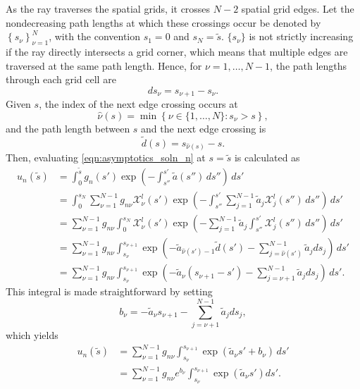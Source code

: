 As the ray traverses the spatial grids, it crosses $N-2$ spatial grid edges.
Let the nondecreasing path lengths at which these crossings occur be denoted by
$\left\{s_\nu\right\}_{\nu=1}^{N}$, with the convention $s_1=0$ and $s_{N}=\tilde{s}$.
$\{s_\nu\}$ is not strictly increasing if the ray directly intersects a grid corner,
which means that multiple edges are traversed at the same path length.
Hence, for $\nu=1,\ldots,N-1$, the path lengths through each grid cell are
\begin{equation*}
  ds_\nu = s_{\nu+1} - s_\nu.
\end{equation*}
Given $s$, the index of the next edge crossing occurs at
\begin{equation*}
  \hat{\nu}(s) = \min\left\{ \nu \in \{1,\ldots,N\} : s_\nu>s \right\},
\end{equation*}
and the path length between $s$ and the next edge crossing is
\begin{equation*}
  \tilde{d}(s) = s_{\hat{\nu}(s)}-s.
\end{equation*}
Then, evaluating \eqref{eqn:asymptotics_soln_n} at $s=\tilde{s}$ is calculated as
\begin{align*}
  u_n(\tilde{s}) &= \int_0^{\tilde{s}}g_n(s')\exp\left( -\int_{s''}^{s'}\tilde{a}(s'')\,ds'' \right)\, ds' \\
  &= \int_0^{s_N} \sum_{\nu=1}^{N-1}g_{n\nu}\mathcal{X}^l_\nu(s') \exp\left( -\int_{s''}^{s'}\sum_{j=1}^{N-1}\tilde{a}_{j}\mathcal{X}^l_j(s'')\,ds'' \right)\, ds' \\
  &= \sum_{\nu=1}^{N-1}g_{n\nu}\int_0^{s_N} \mathcal{X}^l_\nu(s') \exp\left( -\sum_{j=1}^{N-1}\tilde{a}_{j}\int_{s''}^{s'}\mathcal{X}^l_j(s'')\,ds'' \right)\, ds' \\
  &= \sum_{\nu=1}^{N-1}g_{n\nu}\int_{s_\nu}^{s_{\nu+1}}  \exp\left(-\tilde{a}_{\hat{\nu}(s')-1}\tilde{d}(s') -\sum_{j=\hat{\nu}(s')}^{N-1}\tilde{a}_{j}ds_j\right)\, ds' \\
  &= \sum_{\nu=1}^{N-1}g_{n\nu}\int_{s_\nu}^{s_{\nu+1}}  \exp\left(-\tilde{a}_{\nu}(s_{\nu+1}-s') -\sum_{j=\nu+1}^{N-1}\tilde{a}_{j}ds_j\right)\, ds'.
\end{align*}
This integral is made straightforward by setting
\begin{equation*}
  b_\nu = -\tilde{a}_{\nu}s_{\nu+1} - \sum_{j=\nu+1}^{N-1}\tilde{a}_{j}ds_j,
\end{equation*}
which yields
\begin{align*}
  u_n(\tilde{s}) &= \sum_{\nu=1}^{N-1}g_{n\nu}\int_{s_\nu}^{s_{\nu+1}}  \exp\left(\tilde{a}_{\nu}s' + b_\nu\right)\, ds' \\
                 &= \sum_{\nu=1}^{N-1}g_{n\nu}e^{b_\nu}\int_{s_\nu}^{s_{\nu+1}}  \exp\left(\tilde{a}_{\nu}s'\right) ds'.
\end{align*}
